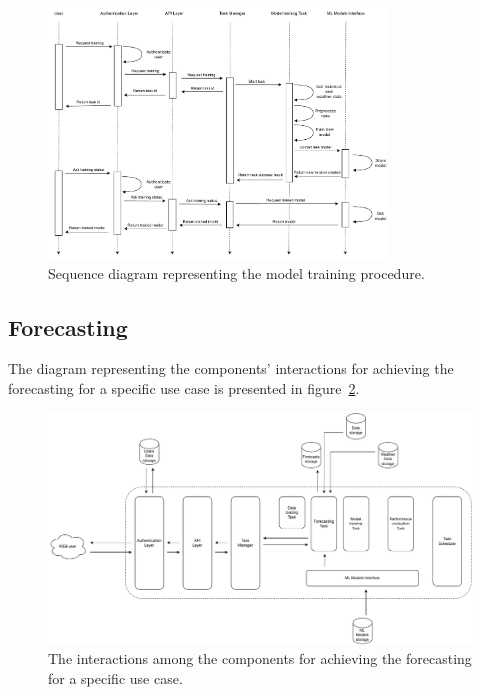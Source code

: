 \begin{figure}[H]
\centering
\includegraphics[width=0.8\textwidth]{images/architecture_training_sequence}
\caption{Sequence diagram representing the model training procedure.}
\label{fig:trainingsequence}
\end{figure}


\vspace{0.1 cm}
\subsection{Forecasting}
\label{sec:forecasting}
\vspace{0.1 cm}

The diagram representing the components' interactions for achieving the forecasting for a specific use case is presented in figure~\ref{fig:forecastinginteractions}.

\begin{figure}[H]
\centering
\includegraphics[width=1\textwidth]{images/architecture_forecasting_interactions}
\caption{The interactions among the components for achieving the forecasting for a specific use case.}
\label{fig:forecastinginteractions}
\end{figure}

